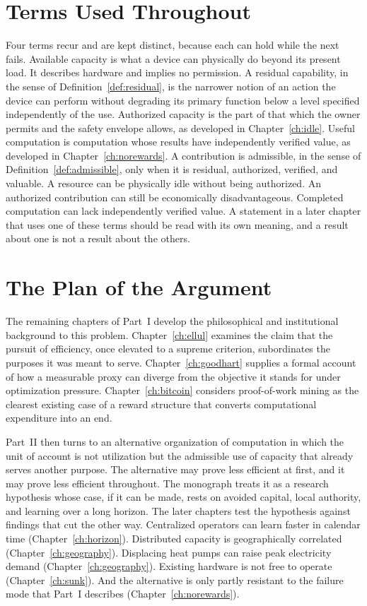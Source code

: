 \section{Terms Used Throughout}

Four terms recur and are kept distinct, because each can hold while the next fails. Available capacity is what a device can physically do beyond its present load. It describes hardware and implies no permission. A residual capability, in the sense of Definition~\ref{def:residual}, is the narrower notion of an action the device can perform without degrading its primary function below a level specified independently of the use. Authorized capacity is the part of that which the owner permits and the safety envelope allows, as developed in Chapter~\ref{ch:idle}. Useful computation is computation whose results have independently verified value, as developed in Chapter~\ref{ch:norewards}. A contribution is admissible, in the sense of Definition~\ref{def:admissible}, only when it is residual, authorized, verified, and valuable. A resource can be physically idle without being authorized. An authorized contribution can still be economically disadvantageous. Completed computation can lack independently verified value. A statement in a later chapter that uses one of these terms should be read with its own meaning, and a result about one is not a result about the others.

\section{The Plan of the Argument}

The remaining chapters of Part~I develop the philosophical and institutional background to this problem. Chapter~\ref{ch:ellul} examines the claim that the pursuit of efficiency, once elevated to a supreme criterion, subordinates the purposes it was meant to serve. Chapter~\ref{ch:goodhart} supplies a formal account of how a measurable proxy can diverge from the objective it stands for under optimization pressure. Chapter~\ref{ch:bitcoin} considers proof-of-work mining as the clearest existing case of a reward structure that converts computational expenditure into an end.

Part~II then turns to an alternative organization of computation in which the unit of account is not utilization but the admissible use of capacity that already serves another purpose. The alternative may prove less efficient at first, and it may prove less efficient throughout. The monograph treats it as a research hypothesis whose case, if it can be made, rests on avoided capital, local authority, and learning over a long horizon. The later chapters test the hypothesis against findings that cut the other way. Centralized operators can learn faster in calendar time (Chapter~\ref{ch:horizon}). Distributed capacity is geographically correlated (Chapter~\ref{ch:geography}). Displacing heat pumps can raise peak electricity demand (Chapter~\ref{ch:geography}). Existing hardware is not free to operate (Chapter~\ref{ch:sunk}). And the alternative is only partly resistant to the failure mode that Part~I describes (Chapter~\ref{ch:norewards}).
